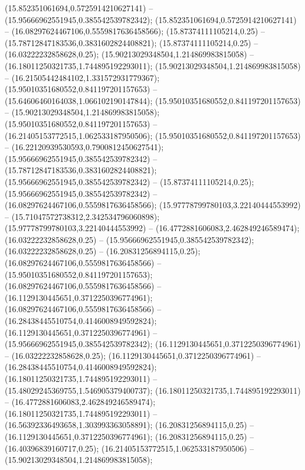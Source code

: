  (15.852351061694,0.5725914210627141) -- (15.95666962551945,0.385542539782342);
 (15.852351061694,0.5725914210627141) -- (16.08297624467106,0.5559817636458566);
 (15.87374111105214,0.25) -- (15.78712847183536,0.3831602824408821);
 (15.87374111105214,0.25) -- (16.03222232858628,0.25);
 (15.90213029348504,1.214869983815058) -- (16.18011250321735,1.744895192293011);
 (15.90213029348504,1.214869983815058) -- (16.21505442484102,1.331572931779367);
 (15.95010351680552,0.841197201157653) -- (15.64606460164038,1.066102190147844);
 (15.95010351680552,0.841197201157653) -- (15.90213029348504,1.214869983815058);
 (15.95010351680552,0.841197201157653) -- (16.21405153772515,1.062533187950506);
 (15.95010351680552,0.841197201157653) -- (16.22120939530593,0.7900812450627541);
 (15.95666962551945,0.385542539782342) -- (15.78712847183536,0.3831602824408821);
 (15.95666962551945,0.385542539782342) -- (15.87374111105214,0.25);
 (15.95666962551945,0.385542539782342) -- (16.08297624467106,0.5559817636458566);
 (15.97778799780103,3.22140444553992) -- (15.71047572738312,2.342534796060898);
 (15.97778799780103,3.22140444553992) -- (16.4772881606083,2.462849246589474);
 (16.03222232858628,0.25) -- (15.95666962551945,0.385542539782342);
 (16.03222232858628,0.25) -- (16.20831256894115,0.25);
 (16.08297624467106,0.5559817636458566) -- (15.95010351680552,0.841197201157653);
 (16.08297624467106,0.5559817636458566) -- (16.1129130445651,0.3712250396774961);
 (16.08297624467106,0.5559817636458566) -- (16.28438445510754,0.4146008949592824);
 (16.1129130445651,0.3712250396774961) -- (15.95666962551945,0.385542539782342);
 (16.1129130445651,0.3712250396774961) -- (16.03222232858628,0.25);
 (16.1129130445651,0.3712250396774961) -- (16.28438445510754,0.4146008949592824);
 (16.18011250321735,1.744895192293011) -- (15.48029245369755,1.546905379400737);
 (16.18011250321735,1.744895192293011) -- (16.4772881606083,2.462849246589474);
 (16.18011250321735,1.744895192293011) -- (16.56392336493658,1.303993363058891);
 (16.20831256894115,0.25) -- (16.1129130445651,0.3712250396774961);
 (16.20831256894115,0.25) -- (16.40396839160717,0.25);
 (16.21405153772515,1.062533187950506) -- (15.90213029348504,1.214869983815058);
